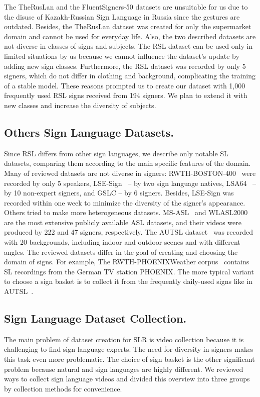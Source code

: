 \documentclass[runningheads]{llncs}
\begin{document}
The TheRusLan and the FluentSigners-50 datasets are unsuitable for us due to the disuse of Kazakh-Russian Sign Language in Russia since the gestures are outdated. Besides, the TheRusLan dataset was created for only the supermarket domain and cannot be used for everyday life. Also, the two described datasets are not diverse in classes of signs and subjects. The RSL dataset can be used only in limited situations by us because we cannot influence the dataset's update by adding new sign classes. Furthermore, the RSL dataset was recorded by only 5 signers, which do not differ in clothing and background, complicating the training of a stable model. These reasons prompted us to create our dataset with 1,000 frequently used RSL signs received from 194 signers. We plan to extend it with new classes and increase the diversity of subjects.


\subsection{Others Sign Language Datasets.}

Since RSL differs from other sign languages, we describe only notable SL datasets, comparing them according to the main specific features of the domain. Many of reviewed datasets are not diverse in signers: RWTH-BOSTON-400~\cite{dreuw2008benchmark} were recorded by only 5 speakers, LSE-Sign~\cite{lse} -- by two sign language natives, LSA64~\cite{lsa} -- by 10 non-expert signers, and GSLC -- by 6 signers. Besides, LSE-Sign was recorded within one week to minimize the diversity of the signer's appearance. Others tried to make more heterogeneous datasets. MS-ASL~\cite{msasl} and WLASL2000~\cite{wlasl} are the most extensive publicly available ASL datasets, and their videos were produced by 222 and 47 signers, respectively. The AUTSL dataset~\cite{autosl} was recorded with 20 backgrounds, including indoor and outdoor scenes and with different angles. The reviewed datasets differ in the goal of creating and choosing the domain of signs. For example, The RWTH-PHOENIXWeather corpus~\cite{rwth-phoenix} contains SL recordings from the German TV station PHOENIX. The more typical variant to choose a sign basket is to collect it from the frequently daily-used signs like in AUTSL~\cite{autosl}. 

\subsection{Sign Language Dataset Collection.}
The main problem of dataset creation for SLR is video collection because it is challenging to find sign language experts. The need for diversity in signers makes this task even more problematic. The choice of sign basket is the other significant problem because natural and sign languages are highly different. We reviewed ways to collect sign language videos and divided this overview into three groups by collection methods for convenience. 
\end{document}
